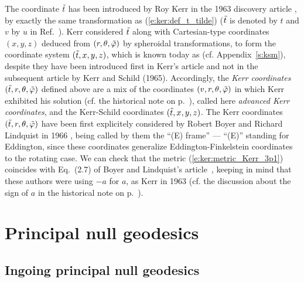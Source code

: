 \begin{hist}
\label{h:ker:coord_ti}
The coordinate ${\tilde t}$ has been introduced by Roy Kerr
in the 1963 discovery article \cite{Kerr63}, by exactly
the same transformation as (\ref{e:ker:def_t_tilde}) (${\tilde t}$ is denoted by $t$
and $v$ by $u$ in Ref.~\cite{Kerr63}).
Kerr considered ${\tilde t}$ along with Cartesian-type coordinates $(x,y,z)$
deduced from $(r,\theta,{\tilde\varphi})$ by spheroidal transformations, to form the
coordinate system $({\tilde t},x,y,z)$, which is known today as
 (cf. Appendix~\ref{s:ksm}),
despite
they have been introduced first in Kerr's article \cite{Kerr63} and not
in the subsequent article by Kerr and Schild \cite{KerrS65} (1965). Accordingly,
the \emph{Kerr coordinates} $({\tilde t}, r, \theta,{\tilde\varphi})$ defined above
are a mix of the coordinates
$(v,r,\theta,{\tilde\varphi})$ in which Kerr exhibited his solution
(cf. the historical note on p.~\pageref{h:ker:Kerr_coord}), called here
\emph{advanced Kerr coordinates},
and the Kerr-Schild coordinates $({\tilde t},x,y,z)$.
The Kerr coordinates $({\tilde t}, r, \theta,{\tilde\varphi})$ have been first explicitely
considered by Robert Boyer and Richard Lindquist
in 1966 \cite{BoyerL67}, being called by them the ``(E) frame'' --- ``(E)'' standing
for Eddington, since these coordinates generalize
Eddington-Finkelstein coordinates to the rotating case.
We can check that the metric (\ref{e:ker:metric_Kerr_3p1}) coincides
with Eq.~(2.7) of Boyer and Lindquist's article~\cite{BoyerL67},
keeping in mind that these authors were using $-a$ for $a$, as Kerr in 1963
(cf. the discussion about the sign of $a$ in
the historical note on p.~\pageref{h:ker:Kerr_coord}).
\end{hist}




\section{Principal null geodesics} \label{s:ker:principal_geod}

\subsection{Ingoing principal null geodesics}

